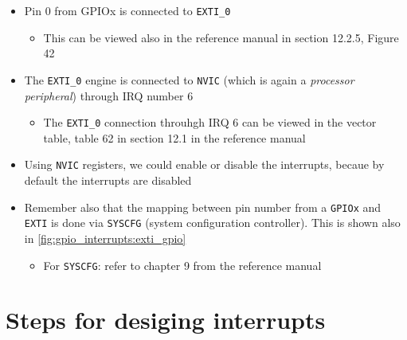 \begin{itemize}

\item Pin 0 from GPIOx is connected to \verb|EXTI_0|

	\begin{itemize}
	\item This can be viewed also in the reference manual in section 12.2.5, Figure 42
	\end{itemize}

\item The \verb|EXTI_0| engine is connected to \verb|NVIC| (which is again a \textit{processor peripheral}) through IRQ number 6

	\begin{itemize}
	\item The \verb|EXTI_0| connection throuhgh IRQ 6 can be viewed in the vector table, table 62 in section 12.1 in the reference manual
	\end{itemize}

\item Using \verb|NVIC| registers, we could enable or disable the interrupts, becaue by default the interrupts are disabled

\item Remember also that the mapping between pin number from a \verb|GPIOx| and \verb|EXTI| is done via \verb|SYSCFG| (system configuration controller). This is shown also in \autoref{fig:gpio_interrupts:exti_gpio}

	\begin{itemize}
	\item For \verb|SYSCFG|: refer to chapter 9 from the reference manual
	\end{itemize}


\end{itemize}

\newpage
\section{Steps for desiging interrupts}

